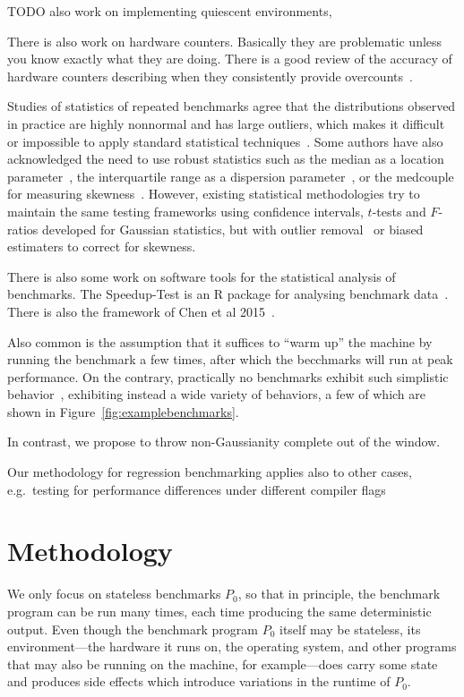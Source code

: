 \documentclass[conference]{IEEEtran}
\begin{document}
TODO also work on implementing quiescent environments,

There is also work on hardware counters. Basically they are problematic unless you know exactly what they are doing. There is a good review of the accuracy of hardware counters describing when they consistently provide overcounts~\cite{Weaver2013}.

Studies of statistics of repeated benchmarks agree that the distributions observed in practice are highly nonnormal and has large outliers, which makes it difficult or impossible to apply standard statistical techniques~\cite{Mytkowicz2009,Kalibera2013,Chen2015,Barrett2016}. Some authors have also acknowledged the need to use robust statistics such as the median as a location parameter~\cite{Mytkowicz2009}, the interquartile range as a dispersion parameter~\cite{Mytkowicz2009}, or the medcouple for measuring skewness~\cite{Rehn2015}.
However, existing statistical methodologies try to maintain the same testing frameworks using confidence intervals, $t$-tests and $F$-ratios developed for Gaussian statistics, but with outlier removal~\cite{Rehn2015} or biased estimaters to correct for skewness.

There is also some work on software tools for the statistical analysis of benchmarks. The Speedup-Test is an R package for analysing benchmark data~\cite{Touati2013}. There is also the framework of Chen et al 2015~\cite{Chen2015}.

Also common is the assumption that it suffices to ``warm up'' the machine by running the benchmark a few times, after which the becchmarks will run at peak performance. On the contrary, practically no benchmarks exhibit such simplistic behavior~\cite{Barrett2016}, exhibiting instead a wide variety of behaviors, a few of which are shown in Figure~\ref{fig:examplebenchmarks}.

In contrast, we propose to throw non-Gaussianity complete out of the window.

Our methodology for regression benchmarking applies also to other cases, e.g.\ testing for performance differences under different compiler flags~\cite{Mytkowicz2009}

\section{Methodology}

We only focus on stateless benchmarks $P_0$, so that in principle, the benchmark program can be run many times, each time producing the same deterministic output. Even though the benchmark program $P_0$ itself may be stateless, its environment---the hardware it runs on, the operating system, and other programs that may also be running on the machine, for example---does carry some state and produces side effects which introduce variations in the runtime of $P_0$.
\end{document}
